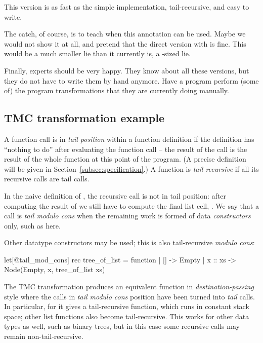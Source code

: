 This version is as fast as the simple implementation, tail-recursive,
and easy to write.

The catch, of course, is to teach when this 
annotation can be used. Maybe we would not show it at all, and pretend
that the direct  version with  is fine. This
would be a much smaller lie than it currently is,
a -sized lie.

Finally, experts should be very happy. They know about all these
versions, but they do not have to write them by hand anymore. Have
a program perform (some of) the program transformations that they are
currently doing manually.

\subsection{TMC transformation example}
\label{subsec:tmc_example}

A function call is in \emph{tail position} within a function
definition if the definition has ``nothing to do'' after evaluating
the function call -- the result of the call is the result of the whole
function at this point of the program. (A precise definition will be
given in Section~\ref{subsec:specification}.) A function is \emph{tail recursive}
if all its recursive calls are tail calls.

In the naive definition of , the recursive call is not in tail
position: after computing the result of  we still have
to compute the final list cell, . We say that a call is
\emph{tail modulo cons} when the remaining work is formed of data
\emph{constructors} only, such as \ocaml{(::)} here.

Other datatype constructors may be used; this is
also tail-recursive \emph{modulo cons}:

\begin{Ocaml}
let[@tail_mod_cons] rec tree_of_list = function
| [] -> Empty
| x :: xs -> Node(Empty, x, tree_of_list xs)
\end{Ocaml}

The TMC transformation produces an equivalent function in
\emph{destination-passing} style where the calls in \emph{tail modulo
  cons} position have been turned into \emph{tail} calls. In
particular, for  it gives a tail-recursive function, which
runs in constant stack space; other list functions also become
tail-recursive. This works for other data types as well, such as binary trees,
but in this case some recursive calls may remain non-tail-recursive.

